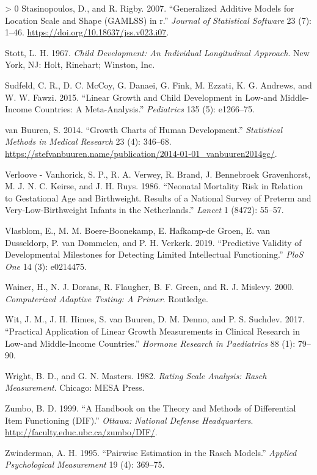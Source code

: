 \documentclass[
]{book}
\newlength{\cslhangindent}
\newenvironment{CSLReferences}[3] %
 {%
  \setlength{\parindent}{0pt}
  \ifodd #1 \everypar{\setlength{\hangindent}{\cslhangindent}}\ignorespaces\fi
  \ifnum #2 > 0
  \setlength{\parskip}{#2\baselineskip}
  \fi
 }%
 {}
\begin{document}
\begin{CSLReferences}{1}{0}
\leavevmode\hypertarget{ref-stasinopoulos2007}{}%
Stasinopoulos, D., and R. Rigby. 2007. {``Generalized Additive Models for Location Scale and Shape ({GAMLSS}) in r.''} \emph{Journal of Statistical Software} 23 (7): 1--46. \url{https://doi.org/10.18637/jss.v023.i07}.

\leavevmode\hypertarget{ref-stott1967}{}%
Stott, L. H. 1967. \emph{Child Development: {A}n Individual Longitudinal Approach}. New York, NJ: Holt, Rinehart; Winston, Inc.

\leavevmode\hypertarget{ref-sudfeld2015linear}{}%
Sudfeld, C. R., D. C. McCoy, G. Danaei, G. Fink, M. Ezzati, K. G. Andrews, and W. W. Fawzi. 2015. {``Linear Growth and Child Development in Low-and Middle-Income Countries: A Meta-Analysis.''} \emph{Pediatrics} 135 (5): e1266--75.

\leavevmode\hypertarget{ref-vanbuuren2014}{}%
van Buuren, S. 2014. {``Growth Charts of Human Development.''} \emph{Statistical Methods in Medical Research} 23 (4): 346--68. \url{https://stefvanbuuren.name/publication/2014-01-01_vanbuuren2014gc/}.

\leavevmode\hypertarget{ref-verloove1986}{}%
Verloove - Vanhorick, S. P., R. A. Verwey, R. Brand, J. Bennebroek Gravenhorst, M. J. N. C. Keirse, and J. H. Ruys. 1986. {``Neonatal Mortality Risk in Relation to Gestational Age and Birthweight. Results of a National Survey of Preterm and Very-Low-Birthweight Infants in the Netherlands.''} \emph{Lancet} 1 (8472): 55--57.

\leavevmode\hypertarget{ref-vlasblom2019}{}%
Vlasblom, E., M. M. Boere-Boonekamp, E. Hafkamp-de Groen, E. van Dusseldorp, P. van Dommelen, and P. H. Verkerk. 2019. {``Predictive Validity of Developmental Milestones for Detecting Limited Intellectual Functioning.''} \emph{PloS One} 14 (3): e0214475.

\leavevmode\hypertarget{ref-wainer2000}{}%
Wainer, H., N. J. Dorans, R. Flaugher, B. F. Green, and R. J. Mislevy. 2000. \emph{Computerized Adaptive Testing: A Primer}. Routledge.

\leavevmode\hypertarget{ref-wit2017practical}{}%
Wit, J. M., J. H. Himes, S. van Buuren, D. M. Denno, and P. S. Suchdev. 2017. {``Practical Application of Linear Growth Measurements in Clinical Research in Low-and Middle-Income Countries.''} \emph{Hormone Research in Paediatrics} 88 (1): 79--90.

\leavevmode\hypertarget{ref-wright1982}{}%
Wright, B. D., and G. N. Masters. 1982. \emph{Rating Scale Analysis: Rasch Measurement}. Chicago: MESA Press.

\leavevmode\hypertarget{ref-zumbo1999}{}%
Zumbo, B. D. 1999. {``A Handbook on the Theory and Methods of Differential Item Functioning ({DIF}).''} \emph{Ottawa: National Defense Headquarters}. \url{http://faculty.educ.ubc.ca/zumbo/DIF/}.

\leavevmode\hypertarget{ref-zwinderman1995}{}%
Zwinderman, A. H. 1995. {``Pairwise Estimation in the Rasch Models.''} \emph{Applied Psychological Measurement} 19 (4): 369--75.

\end{CSLReferences}
\end{document}
